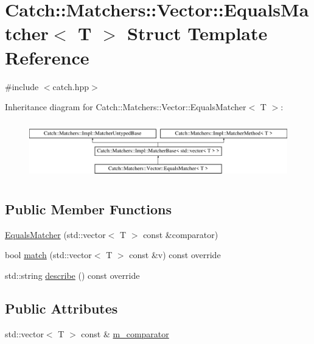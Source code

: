 \hypertarget{struct_catch_1_1_matchers_1_1_vector_1_1_equals_matcher}{}\section{Catch\+::Matchers\+::Vector\+::Equals\+Matcher$<$ T $>$ Struct Template Reference}
\label{struct_catch_1_1_matchers_1_1_vector_1_1_equals_matcher}


{\ttfamily \#include $<$catch.\+hpp$>$}

Inheritance diagram for Catch\+::Matchers\+::Vector\+::Equals\+Matcher$<$ T $>$\+:\begin{figure}[H]
\begin{center}
\leavevmode
\includegraphics[height=2.514970cm]{struct_catch_1_1_matchers_1_1_vector_1_1_equals_matcher}
\end{center}
\end{figure}
\subsection*{Public Member Functions}
\begin{DoxyCompactItemize}
\item 
\mbox{\hyperlink{struct_catch_1_1_matchers_1_1_vector_1_1_equals_matcher_a3846c47780d1991dcfe87aefded98008}{Equals\+Matcher}} (std\+::vector$<$ T $>$ const \&comparator)
\item 
bool \mbox{\hyperlink{struct_catch_1_1_matchers_1_1_vector_1_1_equals_matcher_a2d96cca58a44151fddc5257eda3305da}{match}} (std\+::vector$<$ T $>$ const \&v) const override
\item 
std\+::string \mbox{\hyperlink{struct_catch_1_1_matchers_1_1_vector_1_1_equals_matcher_a36b5f7ecada4081d6c65bebe8ddea6f4}{describe}} () const override
\end{DoxyCompactItemize}
\subsection*{Public Attributes}
\begin{DoxyCompactItemize}
\item 
std\+::vector$<$ T $>$ const  \& \mbox{\hyperlink{struct_catch_1_1_matchers_1_1_vector_1_1_equals_matcher_a56f7aa6f110a12b1b9aeb0cabbc9d755}{m\+\_\+comparator}}
\end{DoxyCompactItemize}
